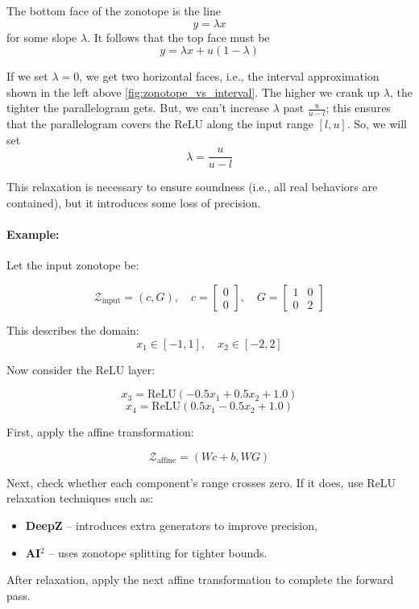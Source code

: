 \documentclass[oneside,11pt,dvipsnames]{book}
\numberwithin{equation}{section}
\theoremstyle{definition}
\theoremstyle{remark}
\begin{document}
The bottom face of the zonotope is the line
\[
y = \lambda x
\]
for some slope \(\lambda\). It follows that the top face must be
\[
y = \lambda x + u(1 - \lambda)
\]

If we set \(\lambda = 0\), we get two horizontal faces, i.e., the interval approximation shown in the left above \ref{fig:zonotope_vs_interval}. The higher we crank up \(\lambda\), the tighter the parallelogram gets. But, we can’t increase \(\lambda\) past \( \frac{u}{u - l} \); this ensures that the parallelogram covers the ReLU along the input range \([l, u]\). So, we will set
\[
\lambda = \frac{u}{u - l}
\]

This relaxation is necessary to ensure soundness (i.e., all real behaviors are contained), but it introduces some loss of precision.

\paragraph{Example:} Let the input zonotope be:

\[
\mathcal{Z}_{\text{input}} = (c, G), \quad
c = \begin{bmatrix} 0 \\ 0 \end{bmatrix}, \quad
G = \begin{bmatrix} 1 & 0 \\ 0 & 2 \end{bmatrix}
\]

This describes the domain:
\[
x_1 \in [-1, 1], \quad x_2 \in [-2, 2]
\]

Now consider the ReLU layer:

\[
x_3 = \text{ReLU}(-0.5x_1 + 0.5x_2 + 1.0)
\]
\[
x_4 = \text{ReLU}(0.5x_1 - 0.5x_2 + 1.0)
\]

First, apply the affine transformation:

\[
\mathcal{Z}_{\text{affine}} = (Wc + b, WG)
\]

Next, check whether each component's range crosses zero. If it does, use ReLU relaxation techniques such as:

\begin{itemize}
    \item \textbf{DeepZ} – introduces extra generators to improve precision,
    \item \textbf{AI\(^2\)} – uses zonotope splitting for tighter bounds.
\end{itemize}

After relaxation, apply the next affine transformation to complete the forward pass.
\end{document}
